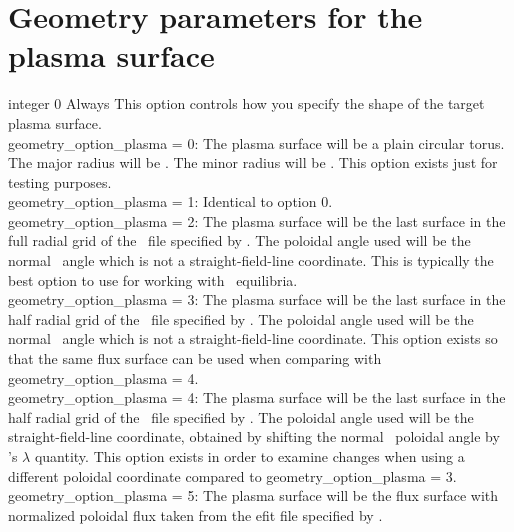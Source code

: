 \section{Geometry parameters for the plasma surface}

{integer}
{0}
{Always}
{This option controls how you specify the shape of the target plasma surface.\\

{\ttfamily geometry\_option\_plasma} = 0: The plasma surface will be a plain circular torus. The major radius will be .
     The minor radius will be . This option exists just for testing purposes.\\

{\ttfamily geometry\_option\_plasma} = 1: Identical to option 0.\\

{\ttfamily geometry\_option\_plasma} = 2: The plasma surface will be the last surface in the full radial grid of the \vmec~file specified by .
The poloidal angle used will be the normal \vmec~angle which is not a straight-field-line coordinate.
This is typically the best option to use for working with \vmec~equilibria.\\

{\ttfamily geometry\_option\_plasma} = 3: The plasma surface will be the last surface in the half radial grid of the \vmec~file specified by .
The poloidal angle used will be the normal \vmec~angle which is not a straight-field-line coordinate.
This option exists so that the same flux surface can be used when comparing with {\ttfamily geometry\_option\_plasma} = 4.\\

{\ttfamily geometry\_option\_plasma} = 4: The plasma surface will be the last surface in the half radial grid of the \vmec~file specified by .
The poloidal angle used will be the straight-field-line coordinate, obtained by shifting the normal \vmec~poloidal angle by \vmec's $\lambda$ quantity.
This option exists in order to examine changes when using a different poloidal coordinate compared to {\ttfamily geometry\_option\_plasma} = 3.\\

{\ttfamily geometry\_option\_plasma} = 5: The plasma surface will be the flux surface with normalized poloidal flux
 taken from the {\ttfamily efit} file specified by . \\

}
